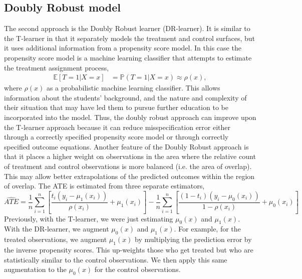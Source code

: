 \documentclass[12pt, a4paper]{article}
\begin{document}
\subsection{Doubly Robust model}

The second approach is the Doubly Robust learner (DR-learner). It is similar to
the T-learner in that it separately models the treatment and control surfaces,
but it uses additional information from a propensity score model. In this case
the propensity score model is a machine learning classifier that attempts
to estimate the treatment assignment process,
\begin{align}
  \mathbb{E}[T{=}1|X{=}x] &= \mathbb{P}(T{=}1|X{=}x) \approx \rho(x),
\end{align}
where $\rho(x)$ as a probabilistic machine learning classifier. This allows
information about the students' background, and the nature and complexity of
their situation that may have led them to pursue further education to be
incorporated into the model. Thus, the doubly robust approach can improve upon
the T-learner approach because it can reduce misspecification error either
through a correctly specified propensity score model or through correctly
specified outcome equations. Another feature of the Doubly Robust approach is
that it places a higher weight on observations in the area where the relative
count of treatment and control observations is more balanced (i.e. the area of
overlap). This may allow better extrapolations of the predicted outcomes within
the region of overlap. The ATE is estimated from three separate estimators, 
\begin{equation}
  \hat{ATE} = \frac{1}{n} \sum_{i=1}^{n}
    \left[\frac{t_i(y_i - \mu_1(x_i))} {\rho(x_i)} + \mu_1(x_i) \right]
    - \frac{1}{n} \sum_{i=1}^{n} 
    \left[ \frac{(1-t_i)(y_i - \mu_0(x_i))}{1-\rho(x_i)} + \mu_0(x_i) \right] \label{eq:DR}
\end{equation}
Previously, with the T-learner, we were just estimating $\mu_0(x)$ and
$\mu_1(x)$. With the DR-learner, we augment $\mu_0(x)$ and $\mu_1(x)$. For
example, for the treated observations, we augment $\mu_1(x)$ by multiplying the
prediction error by the inverse propensity scores. This up-weights those who
get treated but who are statistically similar to the control observations. We
then apply this same augmentation to the $\mu_0(x)$ for the control
observations. 
\end{document}
